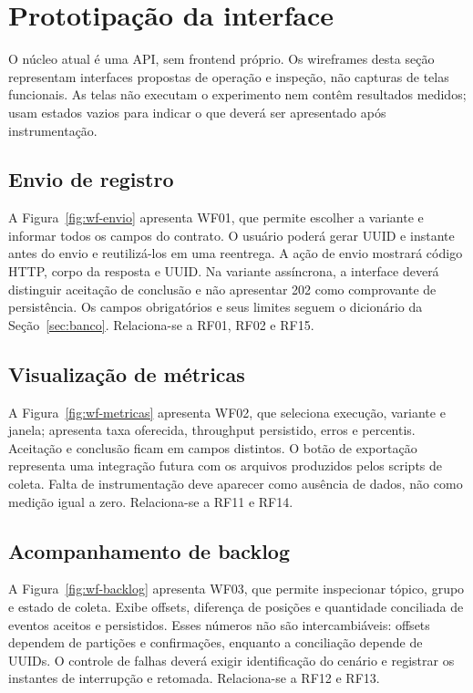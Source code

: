 \section{Prototipação da interface}
\label{sec:interface}
O núcleo atual é uma API, sem frontend próprio. Os wireframes desta seção representam interfaces propostas de operação e inspeção, não capturas de telas funcionais. As telas não executam o experimento nem contêm resultados medidos; usam estados vazios para indicar o que deverá ser apresentado após instrumentação.

\subsection{Envio de registro}
A Figura~\ref{fig:wf-envio} apresenta WF01, que permite escolher a variante e informar todos os campos do contrato. O usuário poderá gerar UUID e instante antes do envio e reutilizá-los em uma reentrega. A ação de envio mostrará código HTTP, corpo da resposta e UUID. Na variante assíncrona, a interface deverá distinguir aceitação de conclusão e não apresentar 202 como comprovante de persistência. Os campos obrigatórios e seus limites seguem o dicionário da Seção~\ref{sec:banco}. Relaciona-se a RF01, RF02 e RF15.

\subsection{Visualização de métricas}
A Figura~\ref{fig:wf-metricas} apresenta WF02, que seleciona execução, variante e janela; apresenta taxa oferecida, throughput persistido, erros e percentis. Aceitação e conclusão ficam em campos distintos. O botão de exportação representa uma integração futura com os arquivos produzidos pelos scripts de coleta. Falta de instrumentação deve aparecer como ausência de dados, não como medição igual a zero. Relaciona-se a RF11 e RF14.

\subsection{Acompanhamento de backlog}
A Figura~\ref{fig:wf-backlog} apresenta WF03, que permite inspecionar tópico, grupo e estado de coleta. Exibe offsets, diferença de posições e quantidade conciliada de eventos aceitos e persistidos. Esses números não são intercambiáveis: offsets dependem de partições e confirmações, enquanto a conciliação depende de UUIDs. O controle de falhas deverá exigir identificação do cenário e registrar os instantes de interrupção e retomada. Relaciona-se a RF12 e RF13.

